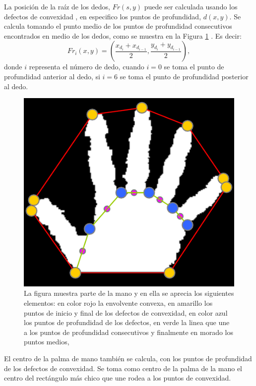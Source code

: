 La posición de la raíz de los dedos, $Fr(s,y)$ puede ser calculada usando los defectos de convexidad \citep{Hummel2014}, en especifico los puntos de profundidad, $d(x,y)$. Se calcula tomando el punto medio de los puntos de profundidad consecutivos encontrados en medio de los dedos, como se muestra en la Figura \ref{fig:RootFingers} . Es decir: 
\begin{equation}
Fr_i(x,y)= \left( \frac{ x_{d_i}+x_{d_{i-1}} }{2},\frac{y_{d_i}+y_{d_{i-1}}}{2}  \right),
\end{equation}
donde $i$ representa el número de dedo, cuando $i=0$ se toma el punto de profundidad anterior al dedo, si $i=6$ se toma el punto de profundidad posterior al dedo. 

\begin{figure}[h!]
\begin{center}
\includegraphics[scale=.55]{./Figures/rootFingers.png}
\end{center}
\caption{La figura muestra parte de la mano y en ella se aprecia los siguientes elementos: en color rojo la envolvente convexa, en amarillo los puntos de inicio y final de los defectos de convexidad,  en color azul los puntos de profundidad de los defectos, en verde la linea que une a los puntos de profundidad consecutivos y finalmente en morado los puntos medios, \protect\citep{Hummel2014}} 
\label{fig:RootFingers}
\end{figure} 

El centro de la palma de mano también se calcula, con los puntos de profundidad de los defectos de convexidad. Se toma como centro de la palma de la mano el centro del rectángulo más chico que une rodea a los puntos de convexidad. 

